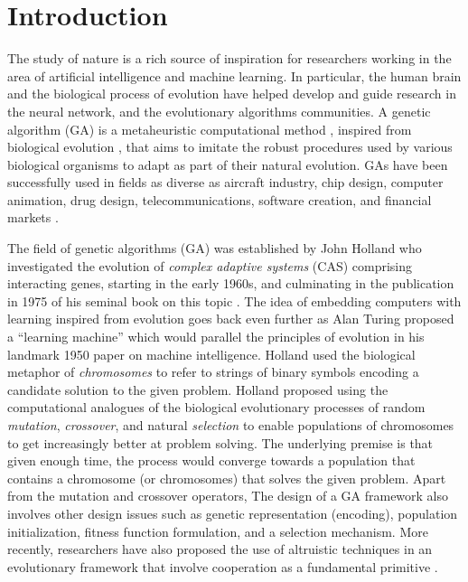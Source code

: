 \documentclass[journal]{IEEEtran}
\begin{document}
\section{Introduction}
\label{sec:introduction}

The study of nature is a rich source of inspiration for researchers working in the area of artificial intelligence and machine learning. In particular, the human brain and the biological process of evolution have helped develop and guide research in the neural network, and the evolutionary algorithms communities.  A genetic algorithm (GA) is a metaheuristic computational method \cite{hillier2001introduction}, inspired from biological evolution \cite{ridley2004evolution}, that aims to imitate the robust procedures used by various biological organisms to adapt as part of their natural evolution. GAs have been successfully used in fields as diverse as aircraft industry, chip design, computer animation, drug design, telecommunications, software creation, and financial markets \cite{mitchell1998introduction}.

The field of genetic algorithms (GA) was established by John Holland who investigated the evolution of \emph{complex adaptive systems} (CAS) comprising interacting genes, starting in the early 1960s, and culminating in the publication in 1975 of his seminal book on this topic \cite{holland1975genetic}. The idea of embedding computers with learning inspired from evolution goes back even further as Alan Turing proposed a ``learning machine'' which would parallel the principles of evolution in his landmark 1950 paper on machine intelligence\cite{turing1950computing}. Holland used the biological metaphor of \textit{chromosomes} to refer to strings of binary symbols encoding a candidate solution to the given problem. Holland proposed using the computational analogues of the biological evolutionary processes of random \textit{mutation}, \textit{crossover}, and natural \textit{selection} \cite{goldberg1988genetic} to enable populations of chromosomes to get increasingly better at problem solving. The underlying premise is that given enough time, the process would converge towards a population that contains a chromosome (or chromosomes) that solves the given problem. Apart from the mutation and crossover operators, The design of a GA framework also involves other design issues such as genetic representation (encoding), population initialization, fitness function formulation, and a selection mechanism. More recently, researchers have also proposed the use of altruistic techniques in an evolutionary framework that involve cooperation as a fundamental primitive \cite{highfield2011supercooperators}. 
\end{document}
